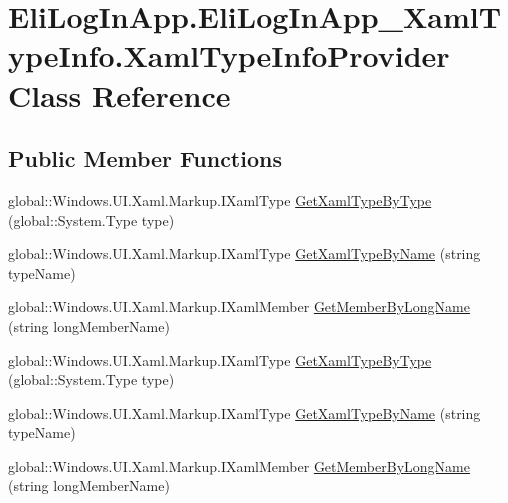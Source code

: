 \hypertarget{class_eli_log_in_app_1_1_eli_log_in_app___xaml_type_info_1_1_xaml_type_info_provider}{}\section{Eli\+Log\+In\+App.\+Eli\+Log\+In\+App\+\_\+\+Xaml\+Type\+Info.\+Xaml\+Type\+Info\+Provider Class Reference}
\label{class_eli_log_in_app_1_1_eli_log_in_app___xaml_type_info_1_1_xaml_type_info_provider}
\subsection*{Public Member Functions}
\begin{DoxyCompactItemize}
\item 
global\+::\+Windows.\+U\+I.\+Xaml.\+Markup.\+I\+Xaml\+Type \hyperlink{class_eli_log_in_app_1_1_eli_log_in_app___xaml_type_info_1_1_xaml_type_info_provider_a3fbc82d96e692b9ee336a4a62c7a5de9}{Get\+Xaml\+Type\+By\+Type} (global\+::\+System.\+Type type)
\item 
global\+::\+Windows.\+U\+I.\+Xaml.\+Markup.\+I\+Xaml\+Type \hyperlink{class_eli_log_in_app_1_1_eli_log_in_app___xaml_type_info_1_1_xaml_type_info_provider_a0592b938104778ab5d79bb384c866521}{Get\+Xaml\+Type\+By\+Name} (string type\+Name)
\item 
global\+::\+Windows.\+U\+I.\+Xaml.\+Markup.\+I\+Xaml\+Member \hyperlink{class_eli_log_in_app_1_1_eli_log_in_app___xaml_type_info_1_1_xaml_type_info_provider_ab9c6cb03a69417e5a0703d644ff557a4}{Get\+Member\+By\+Long\+Name} (string long\+Member\+Name)
\item 
global\+::\+Windows.\+U\+I.\+Xaml.\+Markup.\+I\+Xaml\+Type \hyperlink{class_eli_log_in_app_1_1_eli_log_in_app___xaml_type_info_1_1_xaml_type_info_provider_a3fbc82d96e692b9ee336a4a62c7a5de9}{Get\+Xaml\+Type\+By\+Type} (global\+::\+System.\+Type type)
\item 
global\+::\+Windows.\+U\+I.\+Xaml.\+Markup.\+I\+Xaml\+Type \hyperlink{class_eli_log_in_app_1_1_eli_log_in_app___xaml_type_info_1_1_xaml_type_info_provider_a0592b938104778ab5d79bb384c866521}{Get\+Xaml\+Type\+By\+Name} (string type\+Name)
\item 
global\+::\+Windows.\+U\+I.\+Xaml.\+Markup.\+I\+Xaml\+Member \hyperlink{class_eli_log_in_app_1_1_eli_log_in_app___xaml_type_info_1_1_xaml_type_info_provider_ab9c6cb03a69417e5a0703d644ff557a4}{Get\+Member\+By\+Long\+Name} (string long\+Member\+Name)

\end{DoxyCompactItemize}
